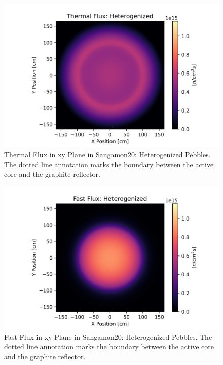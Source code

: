 \begin{figure}[H]
\centering

\includegraphics[width=1.0\linewidth]{figures/therm_xy_plane_het_er.png}
\caption{Thermal Flux in xy Plane in Sangamon20: Heterogenized Pebbles.  The dotted line annotation marks the boundary between the active core and the graphite reflector.}
\label{fig:het-plane-therm}

\end{figure}

\begin{figure}[H]
\centering

\includegraphics[width=1.0\linewidth]{figures/fast_xy_plane_het_er.png}
\caption{Fast Flux in xy Plane in Sangamon20: Heterogenized Pebbles.  The dotted line annotation marks the boundary between the active core and the graphite reflector.}
\label{fig:het-plane-fast}

\end{figure}